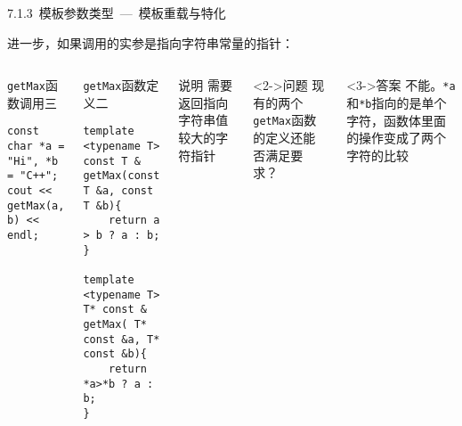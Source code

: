\begin{frame}[fragile]{7.1.3~模板参数类型\normalsize{~---~模板重载与特化}}

进一步，如果调用的实参是指向字符串常量的指针：

\vspace{-4mm}

\begin{columns}[t]

\begin{blueblock}{\texttt{getMax}函数调用三}
\begin{lstlisting}[moreemph={T}]
const char *a = "Hi", *b = "C++";
cout << getMax(a, b) << endl;
\end{lstlisting}
\end{blueblock}
\begin{blueblock}{\texttt{getMax}函数定义二}
\vspace{-2.5mm}\begin{lstlisting}[moreemph={T}]
template <typename T>
const T & getMax(const T &a, const T &b){
    return a > b ? a : b;
}

template <typename T>
T* const & getMax( T* const &a, T* const &b){
    return *a>*b ? a : b;
}
\end{lstlisting}\vspace{-2mm}
\end{blueblock}

\begin{yellowblock}{说明}
需要返回指向字符串值较大的字符指针
\end{yellowblock}
\begin{greenblock}<2->{问题}
现有的两个\texttt{getMax}函数的定义还能否满足要求？
\end{greenblock}
\begin{greenblock}<3->{答案}
不能。\texttt{*a}和\texttt{*b}指向的是单个字符，函数体里面的操作变成了两个字符的比较
\end{greenblock}

\end{columns}

\end{frame}


